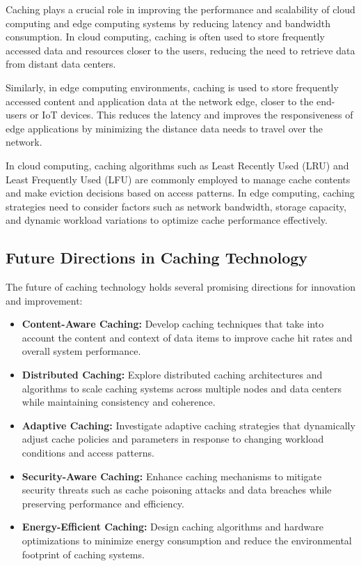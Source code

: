 \documentclass[12pt]{book} %
\begin{document}
Caching plays a crucial role in improving the performance and scalability of cloud computing and edge computing systems by reducing latency and bandwidth consumption. In cloud computing, caching is often used to store frequently accessed data and resources closer to the users, reducing the need to retrieve data from distant data centers.

Similarly, in edge computing environments, caching is used to store frequently accessed content and application data at the network edge, closer to the end-users or IoT devices. This reduces the latency and improves the responsiveness of edge applications by minimizing the distance data needs to travel over the network.

In cloud computing, caching algorithms such as Least Recently Used (LRU) and Least Frequently Used (LFU) are commonly employed to manage cache contents and make eviction decisions based on access patterns. In edge computing, caching strategies need to consider factors such as network bandwidth, storage capacity, and dynamic workload variations to optimize cache performance effectively.

\subsection{Future Directions in Caching Technology}

The future of caching technology holds several promising directions for innovation and improvement:

\begin{itemize}
    \item \textbf{Content-Aware Caching:} Develop caching techniques that take into account the content and context of data items to improve cache hit rates and overall system performance.
    \item \textbf{Distributed Caching:} Explore distributed caching architectures and algorithms to scale caching systems across multiple nodes and data centers while maintaining consistency and coherence.
    \item \textbf{Adaptive Caching:} Investigate adaptive caching strategies that dynamically adjust cache policies and parameters in response to changing workload conditions and access patterns.
    \item \textbf{Security-Aware Caching:} Enhance caching mechanisms to mitigate security threats such as cache poisoning attacks and data breaches while preserving performance and efficiency.
    \item \textbf{Energy-Efficient Caching:} Design caching algorithms and hardware optimizations to minimize energy consumption and reduce the environmental footprint of caching systems.
\end{itemize}
\end{document}
